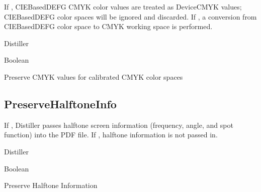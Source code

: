 \documentclass[letterpaper,12pt,english,openany,oneside]{sphinxmanual}
\begin{document}
If  , CIEBasedDEFG CMYK color values are treated as DeviceCMYK values; CIEBasedDEFG color spaces will be ignored and discarded. If  , a conversion from CIEBasedDEFG color space to CMYK working space is performed.

\label{\detokenize{PDF_Create_CommonSettings:supported-by-81}}

Distiller

\label{\detokenize{PDF_Create_CommonSettings:type-80}}

Boolean

\label{\detokenize{PDF_Create_CommonSettings:ui-name-67}}

Preserve CMYK values for calibrated CMYK color spaces

\label{\detokenize{PDF_Create_CommonSettings:default-value-75}}

\begin{sphinxVerbatim}[commandchars=\\\{\}]
\end{sphinxVerbatim}




\subsection{PreserveHalftoneInfo}
\label{\detokenize{PDF_Create_CommonSettings:preservehalftoneinfo}}
If  , Distiller passes halftone screen information (frequency, angle, and spot function) into the PDF file. If  , halftone information is not passed in.

\label{\detokenize{PDF_Create_CommonSettings:supported-by-82}}

Distiller

\label{\detokenize{PDF_Create_CommonSettings:type-81}}

Boolean

\label{\detokenize{PDF_Create_CommonSettings:ui-name-68}}

Preserve Halftone Information

\label{\detokenize{PDF_Create_CommonSettings:default-value-76}}
\end{document}
